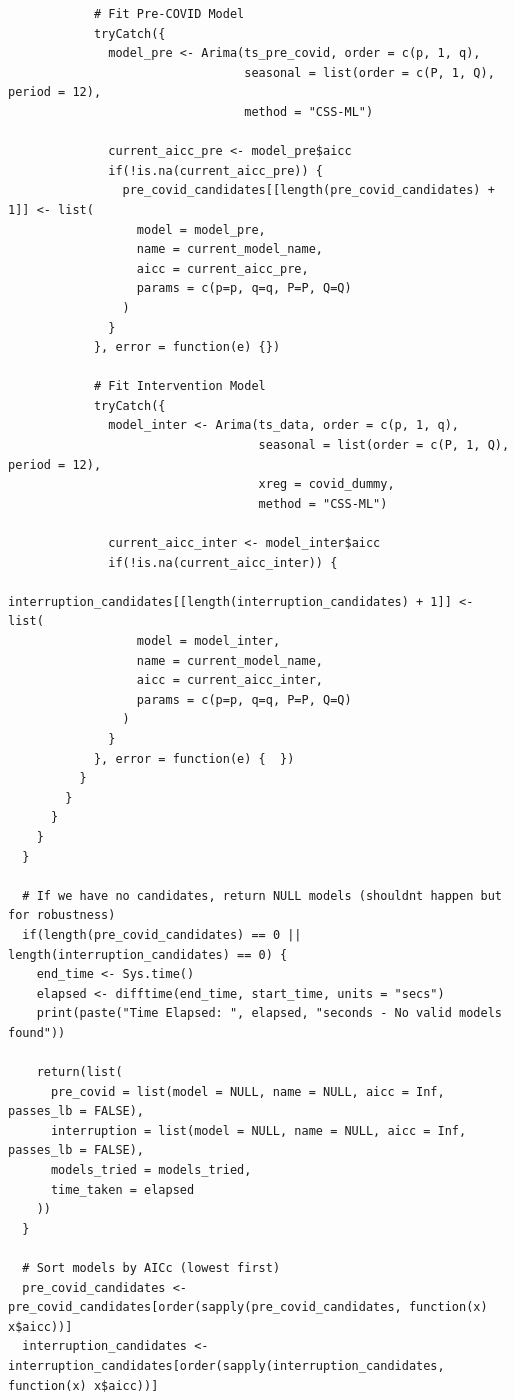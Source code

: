 \documentclass[11pt]{article}
\begin{document}
{\begin{verbatim}
            # Fit Pre-COVID Model
            tryCatch({
              model_pre <- Arima(ts_pre_covid, order = c(p, 1, q), 
                                 seasonal = list(order = c(P, 1, Q), period = 12), 
                                 method = "CSS-ML")
              
              current_aicc_pre <- model_pre$aicc
              if(!is.na(current_aicc_pre)) {
                pre_covid_candidates[[length(pre_covid_candidates) + 1]] <- list(
                  model = model_pre,
                  name = current_model_name,
                  aicc = current_aicc_pre,
                  params = c(p=p, q=q, P=P, Q=Q)
                )
              }
            }, error = function(e) {})
            
            # Fit Intervention Model 
            tryCatch({
              model_inter <- Arima(ts_data, order = c(p, 1, q), 
                                   seasonal = list(order = c(P, 1, Q), period = 12), 
                                   xreg = covid_dummy, 
                                   method = "CSS-ML")
              
              current_aicc_inter <- model_inter$aicc
              if(!is.na(current_aicc_inter)) {
                interruption_candidates[[length(interruption_candidates) + 1]] <- list(
                  model = model_inter,
                  name = current_model_name,
                  aicc = current_aicc_inter,
                  params = c(p=p, q=q, P=P, Q=Q)
                )
              }
            }, error = function(e) {  })
          }
        }
      }
    }
  }
  
  # If we have no candidates, return NULL models (shouldnt happen but for robustness)
  if(length(pre_covid_candidates) == 0 || length(interruption_candidates) == 0) {
    end_time <- Sys.time()
    elapsed <- difftime(end_time, start_time, units = "secs")
    print(paste("Time Elapsed: ", elapsed, "seconds - No valid models found"))
    
    return(list(
      pre_covid = list(model = NULL, name = NULL, aicc = Inf, passes_lb = FALSE),
      interruption = list(model = NULL, name = NULL, aicc = Inf, passes_lb = FALSE),
      models_tried = models_tried,
      time_taken = elapsed
    ))
  }
  
  # Sort models by AICc (lowest first)
  pre_covid_candidates <- pre_covid_candidates[order(sapply(pre_covid_candidates, function(x) x$aicc))]
  interruption_candidates <- interruption_candidates[order(sapply(interruption_candidates, function(x) x$aicc))]
  

\end{verbatim}}
\end{document}
